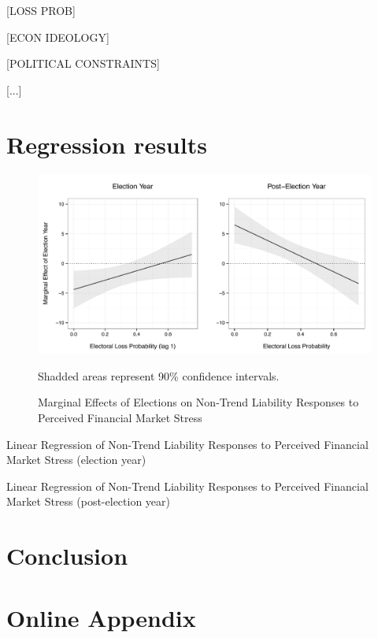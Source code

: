 \documentclass[]{article}
\begin{document}
[LOSS PROB]

[ECON IDEOLOGY]

[POLITICAL CONSTRAINTS]

[...]

\section{Regression results}

\begin{figure}
    \caption{Marginal Effects of Elections on Non-Trend Liability Responses to Perceived Financial Market Stress}
    \label{me_liab_stress}

    \begin{center}
        \includegraphics[scale=0.7]{analysis/figures/me_liab_stress.pdf}
    \end{center}

    {\scriptsize{Shadded areas represent 90\% confidence intervals.}}

\end{figure}

\begin{table}
    \caption{Linear Regression of Non-Trend Liability Responses to Perceived Financial Market Stress (election year)}
    \label{t0_stress}

    \begin{center}
        
    \end{center}

\end{table}

\begin{table}
    \caption{Linear Regression of Non-Trend Liability Responses to Perceived Financial Market Stress (post-election year)}
    \label{t0_stress}

    \begin{center}
        
    \end{center}

\end{table}


\section*{Conclusion}







\section{Online Appendix}


\end{document}
